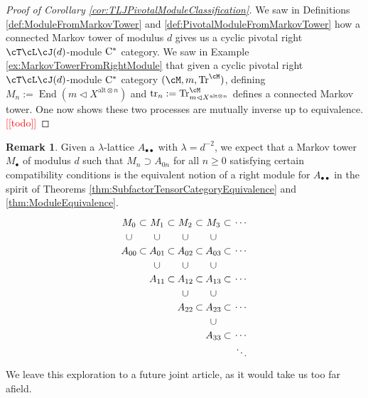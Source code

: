 \documentclass[11pt]{article}
\theoremstyle{plain}
\theoremstyle{definition}
\newtheorem{rem}[thm]{Remark}
\DeclareMathOperator{\End}{End}
\DeclareMathOperator{\Tr}{Tr}
\DeclareMathOperator{\tr}{tr}
\newcommand{\Cstar}{\rm{C^*}}
\newcommand{\nn}[1]{\textcolor{red}{[[#1]]}}
\begin{document}
\begin{proof}[Proof of Corollary \ref{cor:TLJPivotalModuleClassification}]
We saw in Definitions \ref{def:ModuleFromMarkovTower} and \ref{def:PivotalModuleFromMarkovTower} how a connected Markov tower of modulus $d$ gives us a cyclic pivotal right $\cT\cL\cJ(d)$-module $\Cstar$ category.
We saw in Example \ref{ex:MarkovTowerFromRightModule} that given a cyclic pivotal right $\cT\cL\cJ(d)$-module $\Cstar$ category $(\cM, m,\Tr^\cM)$, 
defining $M_n := \End(m \vartriangleleft X^{\text{alt}\otimes n})$ and $\tr_n := \Tr^\cM_{m \vartriangleleft X^{\text{alt}\otimes n}}$ defines a connected Markov tower.
One now shows these two processes are mutually inverse up to equivalence.
\nn{todo}
\end{proof}

\begin{rem}
\label{rem:LambdaLatticeModule}
Given a $\lambda$-lattice $A_{\bullet\bullet}$ with $\lambda = d^{-2}$, we expect that a Markov tower $M_\bullet$ of modulus $d$ such that $M_n \supset A_{0n}$ for all $n\geq 0$ satisfying certain compatibility conditions is the equivalent notion of a right module for $A_{\bullet\bullet}$ in the spirit of Theorems \ref{thm:SubfactorTensorCategoryEquivalence} and \ref{thm:ModuleEquivalence}.
$$
\begin{tikzpicture}
 \node at (0,1) {$M_{0}$};
 \node at (.5,1) {$\subset$};
 \node at (1,1) {$M_{1}$};
 \node at (1.5,1) {$\subset$};
 \node at (2,1) {$M_{2}$};
 \node at (2.5,1) {$\subset$};
 \node at (3,1) {$M_{3}$};
 \node at (3.5,1) {$\subset$};
 \node at (4,1) {$\cdots$};
%
 \node at (0,.5) {$\cup$};
 \node at (1,.5) {$\cup$};
 \node at (2,.5) {$\cup$};
 \node at (3,.5) {$\cup$};
%
 \node at (0,0) {$A_{00}$};
 \node at (.5,0) {$\subset$};
 \node at (1,0) {$A_{01}$};
 \node at (1.5,0) {$\subset$};
 \node at (2,0) {$A_{02}$};
 \node at (2.5,0) {$\subset$};
 \node at (3,0) {$A_{03}$};
 \node at (3.5,0) {$\subset$};
 \node at (4,0) {$\cdots$};
%
 \node at (1,-.5) {$\cup$};
 \node at (2,-.5) {$\cup$};
 \node at (3,-.5) {$\cup$};
%
 \node at (1,-1) {$A_{11}$};
 \node at (1.5,-1) {$\subset$};
 \node at (2,-1) {$A_{12}$};
 \node at (2.5,-1) {$\subset$};
 \node at (3,-1) {$A_{13}$};
 \node at (3.5,-1) {$\subset$};
 \node at (4,-1) {$\cdots$};
%
 \node at (2,-1.5) {$\cup$};
 \node at (3,-1.5) {$\cup$};
%
 \node at (2,-2) {$A_{22}$};
 \node at (2.5,-2) {$\subset$};
 \node at (3,-2) {$A_{23}$};
 \node at (3.5,-2) {$\subset$};
 \node at (4,-2) {$\cdots$};
%
 \node at (3,-2.5) {$\cup$};
%
 \node at (3,-3) {$A_{33}$};
 \node at (3.5,-3) {$\subset$};
 \node at (4,-3) {$\cdots$};
%
 \node at (4,-3.5) {$\ddots$};
\end{tikzpicture}
$$
We leave this exploration to a future joint article, as it would take us too far afield.
\end{rem}
\end{document}
